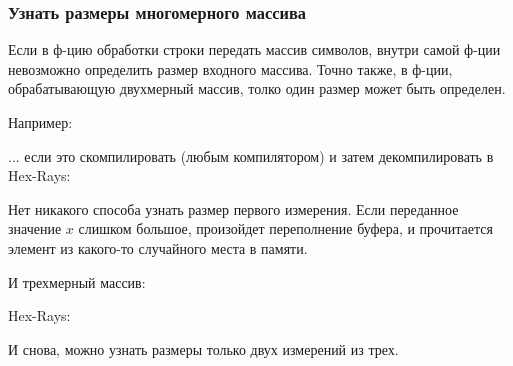 \subsubsection{Узнать размеры многомерного массива}

Если в ф-цию обработки строки передать массив символов, внутри самой ф-ции невозможно определить размер входного массива.
Точно также, в ф-ции, обрабатывающую двухмерный массив, толко один размер может быть определен.

Например:



... если это скомпилировать (любым компилятором) и затем декомпилировать в Hex-Rays:



Нет никакого способа узнать размер первого измерения.
Если переданное значение $x$ слишком большое, произойдет переполнение буфера, и прочитается элемент из какого-то случайного места в памяти.

И трехмерный массив:



Hex-Rays:



И снова, можно узнать размеры только двух измерений из трех.

